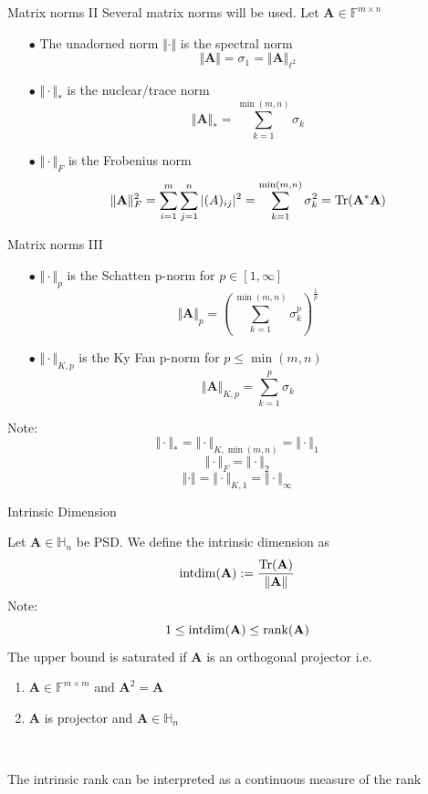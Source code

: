 \documentclass{beamer}
\newcommand{\bvec}[1]{\mathbf{#1}}
\newcommand{\vA}{\bvec{A}}
\begin{document}
\begin{frame}{Matrix norms II}
Several matrix norms will be used. Let $\vA \in \mathbb{F}^{m \times n}$
\begin{itemize}
    \item[$\bullet$] The unadorned norm $\Vert \cdot \Vert$ is the spectral norm
    $$
    \Vert \vA \Vert 
    =
    \sigma_1
    =
    \Vert \vA \Vert_{\ell^2} 
    $$
    \item[$\bullet$] $\Vert \cdot \Vert_*$ is the nuclear/trace norm
    $$
    \Vert \vA \Vert_*
    =
    \sum_{k=1}^{\min(m,n)} \sigma_k
    $$
    \item[$\bullet$] $\Vert \cdot \Vert_F$ is the Frobenius norm
    $$
    \Vert \vA \Vert_F^2
    =
    \sum_{i=1}^m\sum_{j=1}^n |(A)_{ij}|^2
    =
    \sum_{k=1}^{\min(m,n)} \sigma_k^2
    =
    {\rm Tr}(\vA^* \vA)
    $$
\end{itemize}
\end{frame}

\begin{frame}{Matrix norms III}

\begin{itemize}
    \item[$\bullet$] $\Vert \cdot \Vert_p$ is the Schatten p-norm for $p\in [1,\infty]$
    $$
    \Vert \vA \Vert_p
    =
    \left( 
    \sum_{k=1}^{\min(m,n)} \sigma_k^p
    \right)^{\frac{1}{p}}
    $$
    \item[$\bullet$] $\Vert \cdot \Vert_{K,p}$ is the Ky Fan p-norm for $p\leq \min(m,n)$
    $$
    \Vert \vA \Vert_{K,p}
    =
    \sum_{k=1}^{p} \sigma_k
    $$
\end{itemize}
Note:
$$
\Vert \cdot \Vert_*
=
\Vert \cdot \Vert_{K,\min(m,n)} 
=
\Vert \cdot \Vert_{1} 
$$
$$
\Vert \cdot \Vert_F
=
\Vert \cdot \Vert_2
$$
$$
\Vert \cdot \Vert 
= \Vert \cdot \Vert_{K,1}
= \Vert \cdot \Vert_{\infty}
$$
\end{frame}


\begin{frame}{Intrinsic Dimension}

Let $\vA\in\mathbb{H}_n$ be PSD. We define the intrinsic dimension as
$$
{\rm intdim}(\vA)
:=
\frac{{\rm Tr}(\vA)}{\Vert \vA \Vert}
$$
\pause
Note:
$$
1\leq {\rm intdim}(\vA) \leq {\rm rank} (\vA)
$$
The upper bound is saturated if $\vA$ is an orthogonal projector
\pause 
i.e.
\begin{enumerate}
    \item $\vA \in \mathbb{F}^{m\times m}$ and $\vA ^2 = \vA $
    \item $\vA$ is projector and $\vA \in \mathbb{H}_n$
\end{enumerate}
~\\
\begin{center}
The intrinsic rank can be interpreted as a continuous measure of the rank
\end{center}
    
\end{frame}
\end{document}

